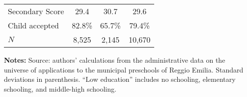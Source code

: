 \documentclass{article}
\begin{document}
\begin{table}[!ht]
\begin{center}
\begin{tabular}{l*{3}{c}}
Secondary Score &      29.4 &      30.7 &      29.6\\
Child accepted &       82.8\% &       65.7\% &       79.4\%\\
\hline
\(N\)        &       8,525 &      2,145  &      10,670 \\
\hline
\end{tabular}
\end{center}
\footnotesize{
{\bfseries Notes:} Source: authors' calculations from the administrative data on the universe of applications to the municipal preschools of Reggio Emilia. Standard deviations in parenthesis. ``Low education'' includes no schooling, elementary schooling, and middle-high schooling.}
\end{table}
\end{document}
